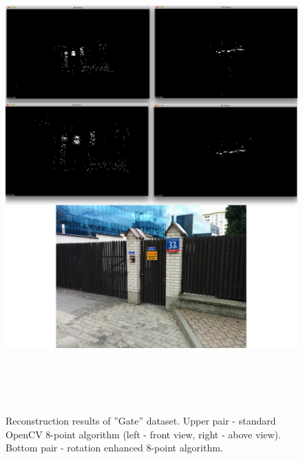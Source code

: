 \begin{figure}[p]
    \centering
    \includegraphics[height=18cm]{Gate4000Comparison}
    \caption[Reconstruction results of ''Gate'' dataset]{Reconstruction results of ''Gate'' dataset. Upper pair - standard OpenCV 8-point algorithm (left - front view, right - above view). Bottom pair - rotation enhanced 8-point algorithm.}
\end{figure}

